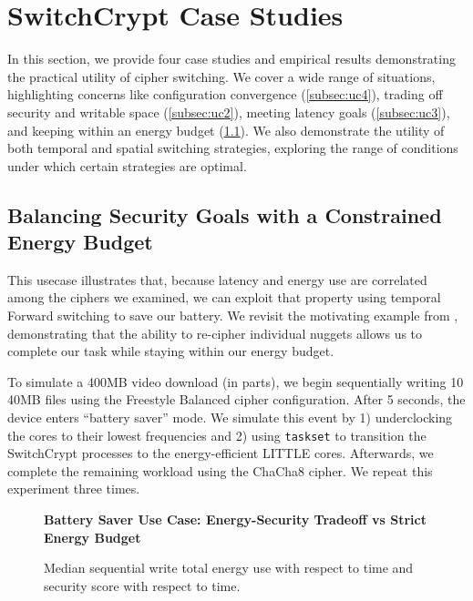 \section{SwitchCrypt Case Studies}\label{sec:usecases}

In this section, we provide four case studies and empirical results
demonstrating the practical utility of cipher switching. We cover a wide range
of situations, highlighting concerns like configuration convergence
(\cref{subsec:uc4}), trading off security and writable space
(\cref{subsec:uc2}), meeting latency goals (\cref{subsec:uc3}), and keeping
within an energy budget (\cref{subsec:uc1}). We also demonstrate the utility of
both temporal and spatial switching strategies, exploring the range of
conditions under which certain strategies are optimal.

\subsection{Balancing Security Goals with a Constrained Energy Budget}\label{subsec:uc1}

This usecase illustrates that, because latency and energy use are correlated
among the ciphers we examined, we can exploit that property using temporal
Forward switching to save our battery. We revisit the motivating example from
, demonstrating that the ability to re-cipher individual
nuggets allows us to complete our task while staying within our energy budget.

To simulate a 400MB video download (in parts), we begin sequentially writing 10
40MB files using the Freestyle Balanced cipher configuration. After 5 seconds,
the device enters ``battery saver'' mode. We simulate this event by 1)
underclocking the cores to their lowest frequencies and 2) using
\texttt{taskset} to transition the SwitchCrypt processes to the energy-efficient
LITTLE cores. Afterwards, we complete the remaining workload using the ChaCha8
cipher. We repeat this experiment three times.

\begin{figure}[ht] \textbf{Battery Saver Use Case: Energy-Security Tradeoff vs
   Strict Energy Budget}\par\medskip
   \centering
   {} \caption{Median sequential write total
   energy use with respect to time and security score with respect to time.}
  \label{fig:usecase-battery}
\end{figure}

